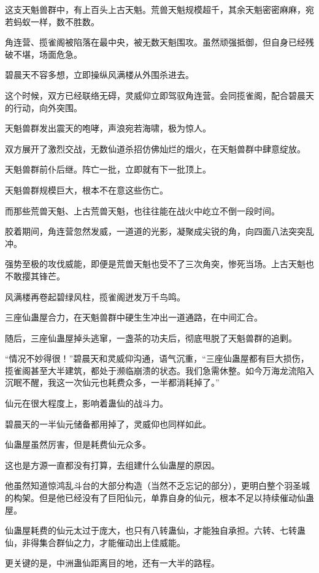 \begin{this_body}
这支天魁兽群中，有上百头上古天魁。荒兽天魁规模超千，其余天魁密密麻麻，宛若蚂蚁一样，数不胜数。

角连营、揽雀阁被陷落在最中央，被无数天魁围攻。虽然顽强抵御，但自身已经残破不堪，场面危急。

碧晨天不容多想，立即操纵风满楼从外围杀进去。

这个时候，双方已经联络无碍，灵威仰立即驾驭角连营。会同揽雀阁，配合碧晨天的行动，向外突围。

天魁兽群发出震天的咆哮，声浪宛若海啸，极为惊人。

双方展开了激烈交战，无数仙道杀招仿佛灿烂的烟火，在天魁兽群中肆意绽放。

天魁兽群前仆后继。阵亡一批，立即就有下一批顶上。

天魁兽群规模巨大，根本不在意这些伤亡。

而那些荒兽天魁、上古荒兽天魁，也往往能在战火中屹立不倒一段时间。

胶着期间，角连营忽然发威，一道道的光影，凝聚成尖锐的角，向四面八法突突乱冲。

强势至极的攻伐威能，即便是荒兽天魁也受不了三次角突，惨死当场。上古天魁也不敢撄其锋芒。

风满楼再卷起碧绿风柱，揽雀阁迸发万千鸟鸣。

三座仙蛊屋合力，在天魁兽群中硬生生冲出一道通路，在中间汇合。

随后，三座仙蛊屋掉头逃窜，一盏茶的功夫后，彻底甩脱了天魁兽群的追剿。

“情况不妙得很！”碧晨天和灵威仰沟通，语气沉重，“三座仙蛊屋都有巨大损伤，揽雀阁甚至大半建筑，都处于濒临崩溃的状态。我们急需休整。如今万海龙流陷入沉眠不醒，我这一次仙元也耗费众多，一半都消耗掉了。”

仙元在很大程度上，影响着蛊仙的战斗力。

碧晨天的一半仙元储备都用掉了，灵威仰也同样如此。

仙蛊屋虽然厉害，但是耗费仙元众多。

这也是方源一直都没有打算，去组建什么仙蛊屋的原因。

他虽然知道惊鸿乱斗台的大部分构造（当然不乏忘记的部分），更明白整个羽圣城的构架。但是他已经没有了巨阳仙元，单靠自身的仙元，根本不足以持续催动仙蛊屋。

仙蛊屋耗费的仙元太过于庞大，也只有八转蛊仙，才能独自承担。六转、七转蛊仙，非得集合群仙之力，才能催动出上佳威能。

更关键的是，中洲蛊仙距离目的地，还有一大半的路程。


\end{this_body}
